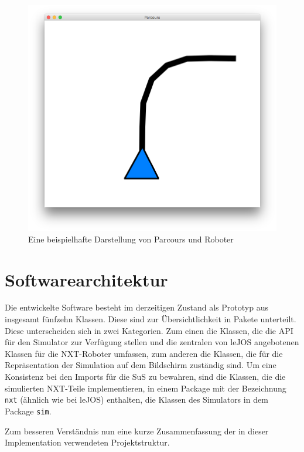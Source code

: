 \documentclass[paper=a4, DIV=14, BCOR=15mm, twoside=on, onecolumn=on, open = right, titlepage =on, parskip =half, headsepline = on, footsepline = on, chapterprefix = on, appendixprefix = off, fontsize = 12pt, numbers = noenddot, abstract = on]{scrbook}
\begin{document}
\begin{figure}[htbp]
\centering
\includegraphics[scale=0.45]{images/simparcours_kurve.png} 
\caption{Eine beispielhafte Darstellung von Parcours und Roboter}
\label{fig:simparcours_kurve}
\end{figure}


\par \singlespacing
\section{Softwarearchitektur}
\onehalfspacing 

Die entwickelte Software besteht im derzeitigen Zustand als Prototyp aus insgesamt fünfzehn Klassen. Diese sind zur Übersichtlichkeit in Pakete unterteilt. Diese unterscheiden sich in zwei Kategorien. Zum einen die Klassen, die die API für den Simulator zur Verfügung stellen und die zentralen von leJOS angebotenen Klassen für die NXT-Roboter umfassen, zum anderen die Klassen, die für die Repräsentation der Simulation auf dem Bildschirm zuständig sind. Um eine Konsistenz bei den Imports für die SuS zu bewahren, sind die Klassen, die die simulierten NXT-Teile implementieren, in einem Package mit der Bezeichnung \texttt{nxt} (ähnlich wie bei leJOS) enthalten, die Klassen des Simulators in dem Package \texttt{sim}. 

Zum besseren Verständnis nun eine kurze Zusammenfassung der in dieser Implementation verwendeten Projektstruktur.
\end{document}
